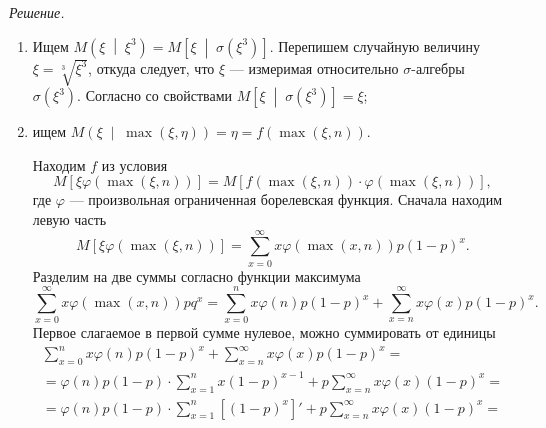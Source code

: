 \textit{Решение.}
\begin{enumerate}[label=\alph*)]
  \item Ищем
  $M \left( \xi \; \middle| \; \xi^3 \right) =
    M \left[ \xi \; \middle| \; \sigma \left( \xi^3 \right) \right] $.
  Перепишем случайную величину $ \xi = \sqrt[3]{ \xi^3}$, откуда следует, что $ \xi $ ---
  измеримая относительно $ \sigma $-алгебры $ \sigma \left( \xi^3 \right) $.
  Согласно со свойствами $M \left[ \xi \; \middle| \; \sigma \left( \xi^3 \right) \right] = \xi $;
  \item ищем
    $M \left( \xi \; \middle| \; \max \left( \xi, \eta \right) \right) =
      \eta =
      f \left( \max \left( \xi, n \right) \right) $.

    Находим $f$ из условия
    $$M \left[ \xi \varphi \left( \max \left( \xi, n \right) \right) \right] =
      M \left[
        f \left( \max \left( \xi, n \right) \right) \cdot
        \varphi \left( \max \left( \xi, n \right) \right)
      \right],$$
    где $ \varphi $ --- произвольная ограниченная борелевская функция.
    Сначала находим левую часть
    $$M \left[ \xi \varphi \left( \max \left( \xi, n \right) \right) \right] =
      \sum \limits_{x = 0}^{ \infty }
        x \varphi \left( \max \left( x, n \right) \right) p \left( 1 - p \right)^x.$$
    Разделим на две суммы согласно функции максимума
    $$ \sum \limits_{x = 0}^{ \infty } x \varphi \left( \max \left( x, n \right) \right) pq^x =
      \sum \limits_{x = 0}^n x \varphi \left( n \right) p \left( 1 - p \right)^x +
      \sum \limits_{x = n}^{ \infty } x \varphi \left( x \right) p \left( 1 - p \right)^x.$$
    Первое слагаемое в первой сумме нулевое, можно суммировать от единицы
    \begin{equation*}
      \begin{split}
        \sum \limits_{x = 0}^n x \varphi \left( n \right) p \left( 1 - p \right)^x +
        \sum \limits_{x = n}^{ \infty } x \varphi \left( x \right) p \left( 1 - p \right)^x = \\
        = \varphi \left( n \right) p \left( 1 - p \right) \cdot
        \sum \limits_{x = 1}^n x \left( 1 - p \right)^{x - 1} +
        p \sum \limits_{x = n}^{ \infty } x \varphi \left( x \right) \left( 1 - p \right)^x = \\
        = \varphi \left( n \right) p \left( 1 - p \right) \cdot
        \sum \limits_{x = 1}^n \left[ \left( 1 - p \right)^x \right]' +
        p \sum \limits_{x = n}^{ \infty } x \varphi \left( x \right) \left( 1 - p \right)^x = \\

\end{split}
\end{equation*}
\end{enumerate}
